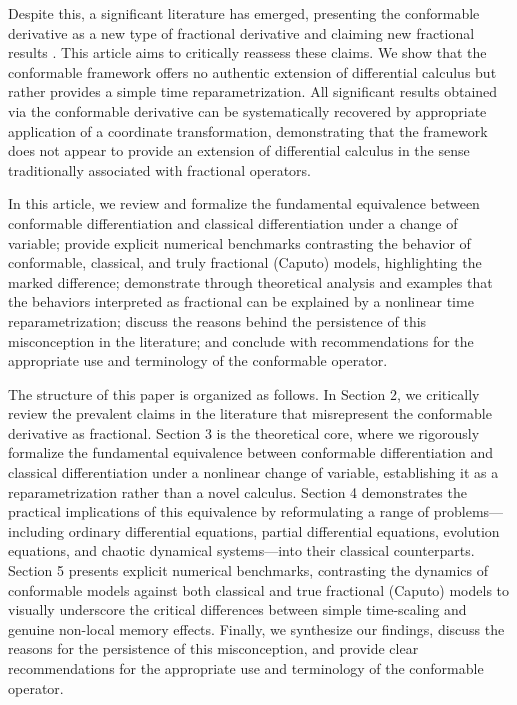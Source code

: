 \documentclass[preprint,12pt]{elsarticle}
\begin{document}
Despite this, a significant literature has emerged, presenting the conformable derivative as a new type of fractional derivative and claiming new fractional results \cite{3, abdeljawad2015}. This article aims to critically reassess these claims. We show that the conformable framework offers no authentic extension of differential calculus but rather provides a simple time reparametrization. All significant results obtained via the conformable derivative can be systematically recovered by appropriate application of a coordinate transformation, demonstrating that the framework does not appear to provide an extension of differential calculus in the sense traditionally associated with fractional operators.

In this article, we review and formalize the fundamental equivalence between conformable differentiation and classical differentiation under a change of variable; provide explicit numerical benchmarks contrasting the behavior of conformable, classical, and truly fractional (Caputo) models, highlighting the marked difference; demonstrate through theoretical analysis and examples that the behaviors interpreted as fractional can be explained by a nonlinear time reparametrization; discuss the reasons behind the persistence of this misconception in the literature; and conclude with recommendations for the appropriate use and terminology of the conformable operator.

The structure of this paper is organized as follows. In Section 2, we critically review the prevalent claims in the literature that misrepresent the conformable derivative as fractional. Section 3 is the theoretical core, where we rigorously formalize the fundamental equivalence between conformable differentiation and classical differentiation under a nonlinear change of variable, establishing it as a reparametrization rather than a novel calculus. Section 4 demonstrates the practical implications of this equivalence by reformulating a range of problems—including ordinary differential equations, partial differential equations, evolution equations, and chaotic dynamical systems—into their classical counterparts. Section 5 presents explicit numerical benchmarks, contrasting the dynamics of conformable models against both classical and true fractional (Caputo) models to visually underscore the critical differences between simple time-scaling and genuine non-local memory effects. Finally, we synthesize our findings, discuss the reasons for the persistence of this misconception, and provide clear recommendations for the appropriate use and terminology of the conformable operator.
\end{document}
